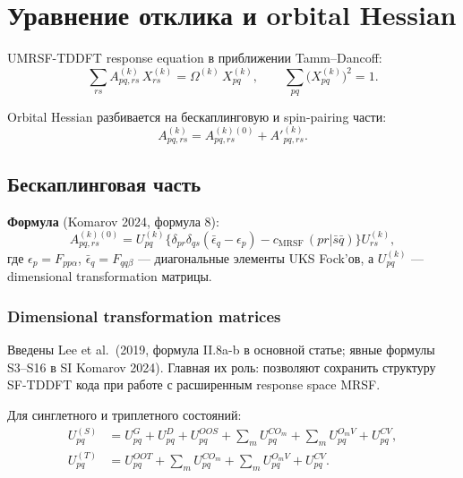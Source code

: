 \documentclass[11pt, a4paper]{article}
\theoremstyle{definition}
\newcommand{\Uk}[2]{U^{(#1)}_{#2}}
\newcommand{\Xk}[2]{X^{(#1)}_{#2}}
\newcommand{\Akz}{A^{(k)(0)}}
\newcommand{\Akprime}{{A'}^{(k)}}
\newcommand{\MRSF}{\text{MRSF}}
\begin{document}
\section{Уравнение отклика и orbital Hessian}
\label{sec:response}

UMRSF-TDDFT response equation в приближении Tamm--Dancoff:
\begin{equation}
    \sum_{rs} A^{(k)}_{pq, rs}\, \Xk{k}{rs} = \Omega^{(k)}\, \Xk{k}{pq}, \qquad
    \sum_{pq} \bigl(\Xk{k}{pq}\bigr)^2 = 1.
    \label{eq:response}
\end{equation}

Orbital Hessian разбивается на бескаплинговую и spin-pairing части:
\begin{equation}
    A^{(k)}_{pq, rs} = \Akz_{pq, rs} + \Akprime_{pq, rs}.
    \label{eq:Adecomp}
\end{equation}

\subsection{Бескаплинговая часть}

\textbf{Формула} (Komarov 2024, формула 8):
\begin{equation}
    \boxed{\;
    \Akz_{pq, rs} = \Uk{k}{pq} \bigl\{ \delta_{pr}\delta_{qs}(\bar\epsilon_q - \epsilon_p) - c_{\MRSF}\, (pr | \bar s \bar q) \bigr\} \Uk{k}{rs},
    \;}
    \label{eq:A0}
\end{equation}
где $\epsilon_p = F_{pp\alpha}$, $\bar\epsilon_q = F_{qq\beta}$ --- диагональные элементы UKS Fock'ов, а $\Uk{k}{pq}$ --- dimensional transformation матрицы.

\subsubsection{Dimensional transformation matrices}

Введены Lee et al.\ (2019, формула II.8a-b в основной статье; явные формулы S3--S16 в SI Komarov 2024). Главная их роль: позволяют сохранить структуру SF-TDDFT кода при работе с расширенным response space MRSF.

Для синглетного и триплетного состояний:
\begin{align}
    \Uk{S}{pq} &= U^G_{pq} + U^D_{pq} + U^{OOS}_{pq} + \sum_m U^{CO_m}_{pq} + \sum_m U^{O_mV}_{pq} + U^{CV}_{pq}, \label{eq:US} \\
    \Uk{T}{pq} &= U^{OOT}_{pq} + \sum_m U^{CO_m}_{pq} + \sum_m U^{O_mV}_{pq} + U^{CV}_{pq}. \label{eq:UT}
\end{align}
\end{document}
